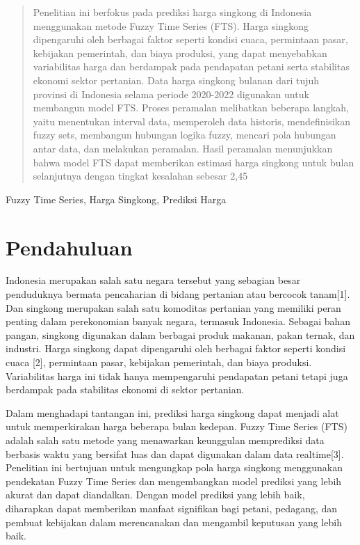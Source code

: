 \documentclass[conference]{IEEEtran}
\renewcommand{\headrulewidth}{0pt}
\renewcommand{\footrulewidth}{0.4pt}
\begin{document}
\begin{abstract}
    Penelitian ini berfokus pada prediksi harga singkong di Indonesia menggunakan metode Fuzzy Time Series (FTS). Harga singkong dipengaruhi oleh berbagai faktor seperti kondisi cuaca, permintaan pasar, kebijakan pemerintah, dan biaya produksi, yang dapat menyebabkan variabilitas harga dan berdampak pada pendapatan petani serta stabilitas ekonomi sektor pertanian. Data harga singkong bulanan dari tujuh provinsi di Indonesia selama periode 2020-2022 digunakan untuk membangun model FTS. Proses peramalan melibatkan beberapa langkah, yaitu menentukan interval data, memperoleh data historis, mendefinisikan fuzzy sets, membangun hubungan logika fuzzy, mencari pola hubungan antar data, dan melakukan peramalan. Hasil peramalan menunjukkan bahwa model FTS dapat memberikan estimasi harga singkong untuk bulan selanjutnya dengan tingkat kesalahan sebesar 2,45%
\end{abstract}

\begin{IEEEkeywords}
Fuzzy Time Series, Harga Singkong, Prediksi Harga
\end{IEEEkeywords}

\thispagestyle{fancy}
\fancyhf{}
\fancyfoot[C]{\thepage}
\renewcommand{\headrulewidth}{0pt}
\renewcommand{\footrulewidth}{0.4pt}
\section{Pendahuluan}
Indonesia merupakan salah satu negara tersebut yang sebagian besar penduduknya bermata pencaharian di bidang pertanian atau bercocok tanam[1]. Dan singkong merupakan salah satu komoditas pertanian yang memiliki peran penting dalam perekonomian banyak negara, termasuk Indonesia. Sebagai bahan pangan, singkong digunakan dalam berbagai produk makanan, pakan ternak, dan industri.  Harga singkong dapat dipengaruhi oleh berbagai faktor seperti kondisi cuaca [2], permintaan pasar, kebijakan pemerintah, dan biaya produksi. Variabilitas harga ini tidak hanya mempengaruhi pendapatan petani tetapi juga berdampak pada stabilitas ekonomi di sektor pertanian.

Dalam menghadapi tantangan ini, prediksi harga singkong dapat menjadi alat untuk memperkirakan harga beberapa bulan kedepan. Fuzzy Time Series (FTS) adalah salah satu metode yang menawarkan keunggulan memprediksi data berbasis waktu yang bersifat luas dan dapat digunakan dalam data realtime[3]. Penelitian ini bertujuan untuk mengungkap pola harga singkong menggunakan pendekatan Fuzzy Time Series dan mengembangkan model prediksi yang lebih akurat dan dapat diandalkan. Dengan model prediksi yang lebih baik, diharapkan dapat memberikan manfaat signifikan bagi petani, pedagang, dan pembuat kebijakan dalam merencanakan dan mengambil keputusan yang lebih baik.
\end{document}
